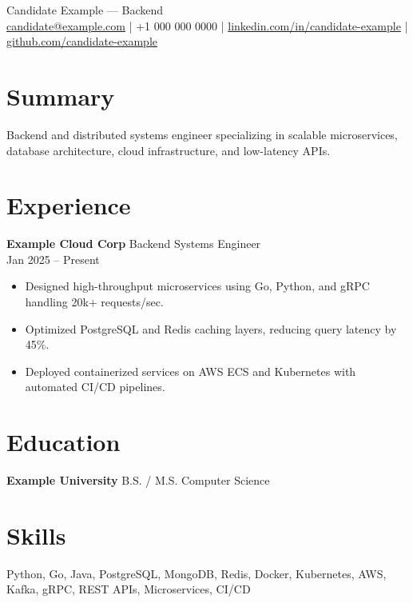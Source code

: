 \documentclass[10pt]{article}
\begin{document}
\begin{center}
{\LARGE Candidate Example — Backend}\\
\href{mailto:candidate@example.com}{candidate@example.com} |
+1 000 000 0000 |
\href{https://www.linkedin.com/in/candidate-example}{linkedin.com/in/candidate-example} |
\href{https://github.com/candidate-example}{github.com/candidate-example}
\end{center}

\section*{Summary}
Backend and distributed systems engineer specializing in scalable microservices, database architecture, cloud infrastructure, and low-latency APIs.

\section*{Experience}
\textbf{Example Cloud Corp} \hfill Backend Systems Engineer \\
Jan 2025 -- Present
\begin{itemize}
  \item Designed high-throughput microservices using Go, Python, and gRPC handling 20k+ requests/sec.
  \item Optimized PostgreSQL and Redis caching layers, reducing query latency by 45\%.
  \item Deployed containerized services on AWS ECS and Kubernetes with automated CI/CD pipelines.
\end{itemize}

\section*{Education}
\textbf{Example University} \hfill B.S. / M.S. Computer Science

\section*{Skills}
Python, Go, Java, PostgreSQL, MongoDB, Redis, Docker, Kubernetes, AWS, Kafka, gRPC, REST APIs, Microservices, CI/CD
\end{document}
